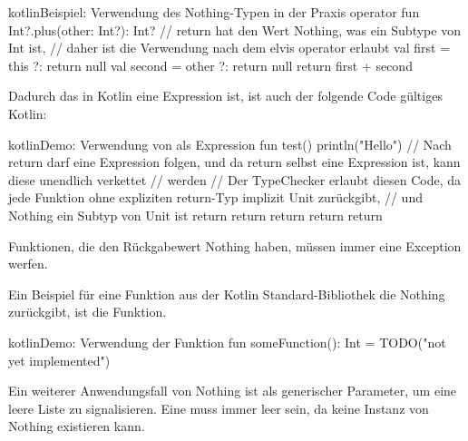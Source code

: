 \begin{codeBlock}{kotlin}{Beispiel: Verwendung des Nothing-Typen in der Praxis}
operator fun Int?.plus(other: Int?): Int? {
    // return hat den Wert Nothing, was ein Subtype von Int ist,
    // daher ist die Verwendung nach dem elvis operator erlaubt
    val first = this ?: return null
    val second = other ?: return null
    return first + second
}
\end{codeBlock}

Dadurch das  in Kotlin eine Expression ist, ist auch der folgende Code gültiges Kotlin:

\begin{codeBlock}{kotlin}{Demo: Verwendung von  als Expression}
fun test() {
    println("Hello")
    // Nach return darf eine Expression folgen, und da return selbst eine Expression ist, kann diese unendlich verkettet
    // werden
    // Der TypeChecker erlaubt diesen Code, da jede Funktion ohne expliziten return-Typ implizit Unit zurückgibt,
    // und Nothing ein Subtyp von Unit ist
    return return return return return
}
\end{codeBlock}

Funktionen, die den Rückgabewert Nothing haben, müssen immer eine Exception werfen.


Ein Beispiel für eine Funktion aus der Kotlin Standard-Bibliothek die Nothing zurückgibt, ist die
 Funktion.

\begin{codeBlock}{kotlin}{Demo: Verwendung der  Funktion}
fun someFunction(): Int = TODO("not yet implemented")
\end{codeBlock}

Ein weiterer Anwendungsfall von Nothing ist als generischer Parameter, um \zB eine leere Liste zu signalisieren.
Eine  muss immer leer sein, da keine Instanz von Nothing existieren kann.

\renewcommand{\kapitelautor}{}
